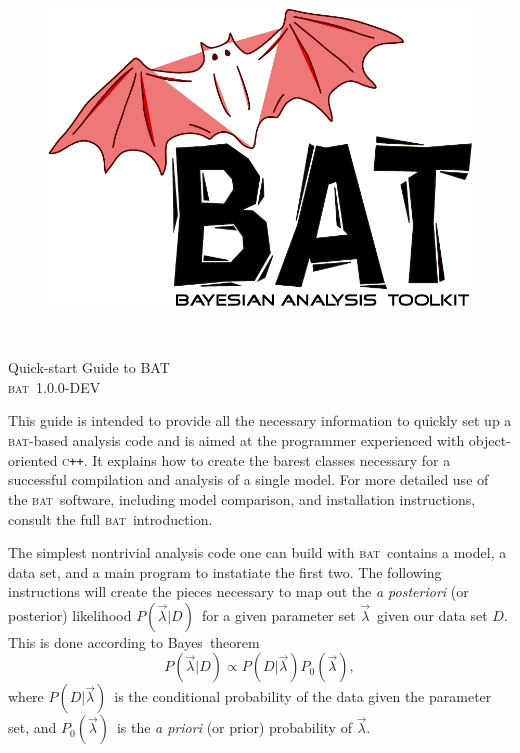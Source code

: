 \documentclass[a4paper,11pt]{article}
\newcommand{\acronym}[1]{\textsc{#1}}
\newcommand{\BAT}{\acronym{bat}}
\newcommand{\C}{\textsc{c}}
\newcommand{\CPP}{\C\texttt{++}}
\newcommand{\BProb}[2]{\ensuremath{P(#1|#2)}}
\newcommand{\BPars}{\ensuremath{\vec{\lambda}}}
\newcommand{\BData}{\ensuremath{D}}
\newcommand{\BPrior}{\ensuremath{P_0(\BPars)}}
\newcommand{\BPosterior}{\BProb{\BPars}{\BData}}
\newcommand{\BConditional}{\BProb{\BData}{\BPars}}
\begin{document}

\begin{figure}[t]
\includegraphics[scale=0.25]{bat}
\end{figure}
\quad\\
\vspace{2\baselineskip}

\begin{center}
  {\Large Quick-start Guide to BAT}\\
  \vspace{1\baselineskip}
  {\large \BAT\ 1.0.0-DEV}
\end{center}

\vspace{4\baselineskip}

This guide is intended to provide all the necessary information to
quickly set up a \BAT-based analysis code and is aimed at the
programmer experienced with object-oriented \CPP. It explains how to
create the barest classes necessary for a successful compilation and
analysis of a single model. For more detailed use of the \BAT\
software, including model comparison, and installation instructions,
consult the full \BAT\ introduction.

The simplest nontrivial analysis code one can build with \BAT\
contains a model, a data set, and a main program to instatiate the
first two. The following instructions will create the pieces necessary
to map out the \emph{a posteriori} (or posterior) likelihood
\BPosterior\ for a given parameter set \BPars\ given our data set
\BData.  This is done according to Bayes\ theorem
\begin{displaymath}
  \BPosterior \propto \BConditional\BPrior,
\end{displaymath}
where \BConditional\ is the conditional probability of the data given
the parameter set, and \BPrior\ is the \emph{a priori} (or prior)
probability of \BPars.
\end{document}
